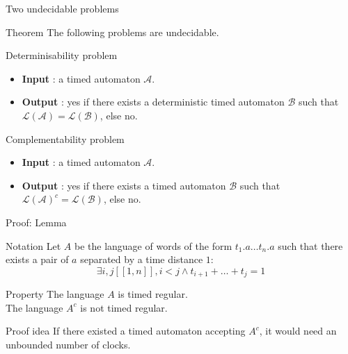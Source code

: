 
\begin{frame}{Two undecidable problems}

  \begin{block}{Theorem}
    The following problems are undecidable.
  \end{block}

  \begin{alertblock}{Determinisability problem}
    \begin{itemize}
	\item \textbf{Input} : a timed automaton $\mathcal{A}$.
	\item \textbf{Output} : yes if there exists a deterministic timed automaton $\mathcal{B}$ such that $\mathcal{L}(\mathcal{A}) = \mathcal{L}(\mathcal{B})$, else no.
    \end{itemize}
  \end{alertblock}
  
    \begin{alertblock}{Complementability problem}
    \begin{itemize}
	\item \textbf{Input} : a timed automaton $\mathcal{A}$.
	\item \textbf{Output} : yes if there exists a timed automaton $\mathcal{B}$ such that $\mathcal{L}(\mathcal{A})^c = \mathcal{L}(\mathcal{B})$, else no.
    \end{itemize}
  \end{alertblock}

\end{frame}


\begin{frame}{Proof: Lemma}

   \begin{block}{Notation}
    Let $A$ be the language of words of the form $t_1.a\dots t_n.a$ such that there exists a pair of $a$ separated by a time distance $1$:
$$\exists i,j [\![1,n]\!], i < j  \land  t_{i+1} + \dots + t_j = 1$$
  \end{block}

  \begin{block}{Property}
    The language $A$ is timed regular.\\
    The language $A^c$ is not timed regular.
  \end{block}

  \begin{block}{Proof idea}
    If there existed a timed automaton accepting $A^c$, it would need an unbounded number of clocks.\\
  \end{block}

\end{frame}




